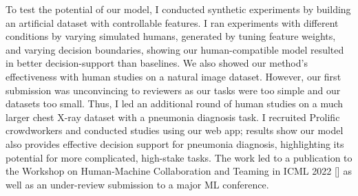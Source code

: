 To test the potential of our model, I conducted synthetic experiments by building an artificial dataset with controllable features. I ran experiments with different conditions by varying simulated humans, generated by tuning feature weights, and varying decision boundaries, showing our human-compatible model resulted in better decision-support than baselines. We also showed our method's effectiveness with human studies on a natural image dataset. However, our first submission was unconvincing to reviewers as our tasks were too simple and our datasets too small. Thus, I led an additional round of human studies on a much larger chest X-ray dataset with a pneumonia diagnosis task. I recruited Prolific crowdworkers and conducted studies using our web app; results show our model also provides effective decision support for pneumonia diagnosis, highlighting its potential for more complicated, high-stake tasks. 
The work led to a publication to the Workshop on Human-Machine Collaboration and Teaming in ICML 2022 [] as well as an under-review submission to a major ML conference.










